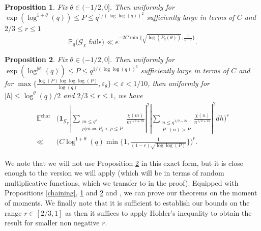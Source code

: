 \documentclass[10pt,a4paper]{amsart}
\newtheorem{proposition}{Proposition}[section]
\numberwithin{equation}{section}
\begin{document}
\begin{proposition}
    Fix $\theta \in (-1/2,0]$. Then uniformly for $\exp(\log^{1+\theta}(q)) \leq P \leq q^{1/(\log\log(q))^2}$ sufficiently large in terms of $C$ and $2/3 \leq r \leq 1$
    $$\mathbb{P}_q\big(\mathcal{G}_\chi \text{ fails}\big) \ll e^{-2C\min\{\sqrt{\log(P_q(\theta))},\frac{1}{1-r}\}}.$$ \label{bad_chaining_moment}
\end{proposition}
\begin{proposition}
    Fix $\theta \in (-1/2,0]$. Then uniformly for $\exp(\log^{|\theta|}(q)) \leq P \leq q^{1/(\log\log(q))^6}$ sufficiently large in terms of $C$ and \\ for $\max\{\frac{\log(P)\log\log\log(P)}{\log(q)},\varepsilon_\theta\}<\varepsilon < 1/10$, then uniformly for $|h| \leq \log^{\theta}(q)/2$ and $2/3 \leq r \leq 1$, we have
    \begin{align*}
        \mathbb{E}^{\text{char}}&\big(\mathbf{1}_{\mathcal{G}_\chi}|\sum_{\substack{m \leq q^\varepsilon \\ p|m \Rightarrow P_\theta < p \leq P}}\frac{\chi(m)}{m^{1/2+ih}}|^2|\sum_{\substack{n \leq q^{1/2-2\varepsilon} \\ P^{-}(n) > P}}\frac{\chi(n)}{n^{1/2+ih}}|^2dh\big)^r \\ \ll& \big(C\log^{1+\theta}(q)\min\{1,\frac{1}{(1-r)\sqrt{\log\log(P)}}\}\big)^r.
    \end{align*}\label{good_moment_bound}
\end{proposition}
We note that we will not use Proposition \ref{good_moment_bound} in this exact form, but it is close enough to the version we will apply (which will be in terms of random multiplicative functions, which we transfer to in the proof). Equipped with Propositions \ref{chaining}, \ref{bad_chaining_moment} and \ref{good_moment_bound} and , we can prove our theorems on the moment of moments. We finally note that it is sufficient to establish our bounds on the range $r \in[2/3,1]$ as then it suffices to apply Holder's inequality to obtain the result for smaller non negative $r$.
\end{document}
